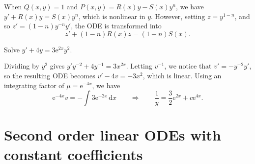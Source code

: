 \documentclass[letter-paper]{tufte-book}
\newenvironment{example}[1][Example]{\begin{trivlist}
\item[\hskip \labelsep {\bfseries #1}]}{\end{trivlist}}
\newcommand{\ex}{\mathrm{e}}
\begin{document}
When $Q(x,y)=1$ and $P(x,y)=R(x)y - S(x) y^n$, we have $y' + R(x)y = S(x)y^n$,
which is nonlinear in $y$. However, setting $z=y^{1-n}$, and so
$z'=(1-n)y^{-n}y'$, the ODE is transformed into
\begin{equation*}
  z'+(1-n)R(x)z = (1-n)S(x).
\end{equation*}
\begin{example}
  Solve $y' + 4y = 3\ex^{2x}y^2$.
  
  Dividing by $y^2$ gives $y'y^{-2} + 4y^{-1} = 3x^{2x}$. Letting $v^{-1}$, we
  notice that $v'=-y^{-2}y'$, so the resulting ODE becomes $v' - 4v = -3x^{2}$,
  which is linear. Using an integrating factor of $\mu=\ex^{-4x}$, we have
  \begin{equation*}
    \ex^{-4x}v = -\int 3\ex^{-2x}\, \mathrm{d}x \qquad\Rightarrow\qquad
    \frac{1}{y} = \frac{3}{2}\ex^{2x}+c\ex^{4x}.
  \end{equation*}
\end{example}


\section{Second order linear ODEs with constant coefficients}
\end{document}
